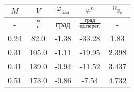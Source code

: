 \begin{tabular}{|c|c|c|c|c|}
\hline
$M$ & $V$ & $\varphi_{бал}$ & $\varphi^{n}$ & $n_{y_{p}}$ \\ 
\hline
- & $\frac{м}{с}$ & град & $\frac{град}{ед.перег.}$ & - \\ 
\hline
0.24 & 82.0 & -1.38 & -33.28 & 1.83 \\ 
\hline
0.31 & 105.0 & -1.11 & -19.95 & 2.398 \\ 
\hline
0.41 & 139.0 & -0.94 & -11.52 & 3.437 \\ 
\hline
0.51 & 173.0 & -0.86 & -7.54 & 4.732 \\ 
\hline
\end{tabular}